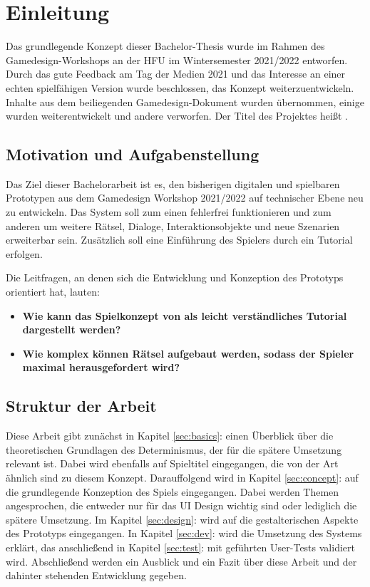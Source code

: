 \chapter{Einleitung}\label{sec:intro}
Das grundlegende Konzept dieser Bachelor-Thesis wurde im Rahmen des Gamedesign-Workshops an der \ac{HFU} im Wintersemester 2021/2022 entworfen.
Durch das gute Feedback am Tag der Medien 2021 und das Interesse an einer echten spielfähigen Version wurde beschlossen, das Konzept weiterzuentwickeln. 
Inhalte aus dem beiliegenden Gamedesign-Dokument wurden übernommen, einige wurden weiterentwickelt und andere verworfen. 
Der Titel des Projektes heißt .


\section{Motivation und Aufgabenstellung}
Das Ziel dieser Bachelorarbeit ist es, den bisherigen digitalen und spielbaren Prototypen aus dem Gamedesign Workshop 2021/2022 auf technischer Ebene neu zu entwickeln. Das System soll zum einen fehlerfrei funktionieren und zum anderen um weitere Rätsel, Dialoge, Interaktionsobjekte und neue Szenarien erweiterbar sein. Zusätzlich soll eine Einführung des Spielers durch ein Tutorial erfolgen. 


Die Leitfragen, an denen sich die Entwicklung und Konzeption des Prototyps orientiert hat, lauten:
\begin{itemize}  
    \item \textbf{Wie kann das Spielkonzept von  \emph{} als leicht verständliches Tutorial dargestellt werden?}
    \item \textbf{Wie komplex können Rätsel aufgebaut werden, sodass der Spieler maximal herausgefordert wird?}
\end{itemize}

\section{Struktur der Arbeit}
Diese Arbeit gibt zunächst in Kapitel \ref{sec:basics}:  einen Überblick über die theoretischen Grundlagen des Determinismus, der für die spätere Umsetzung relevant ist. Dabei wird ebenfalls auf Spieltitel eingegangen, die von der Art ähnlich sind zu diesem Konzept. Darauffolgend wird in Kapitel \ref{sec:concept}:  auf die grundlegende Konzeption des Spiels eingegangen. Dabei werden Themen angesprochen, die entweder nur für das \ac{UI} Design wichtig sind oder lediglich die spätere Umsetzung. Im Kapitel \ref{sec:design}:  wird auf die gestalterischen Aspekte des Prototyps eingegangen. In Kapitel \ref{sec:dev}:  wird die Umsetzung des Systems erklärt, das anschließend in Kapitel \ref{sec:test}:  mit geführten User-Tests validiert wird. Abschließend werden ein Ausblick und ein Fazit über diese Arbeit und der dahinter stehenden Entwicklung gegeben.
